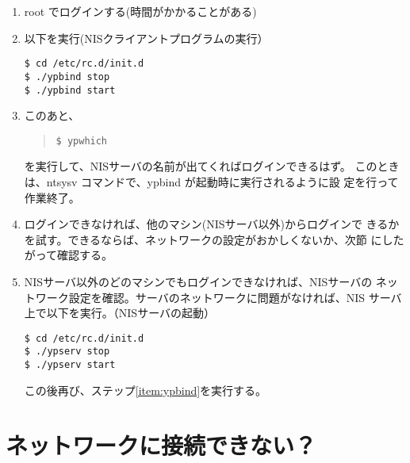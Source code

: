 \documentclass{jreport}
\begin{document}
\begin{enumerate}
\item root でログインする(時間がかかることがある)
\item \label{item:ypbind}以下を実行(NISクライアントプログラムの実行）
  \begin{screen}
\begin{verbatim}
$ cd /etc/rc.d/init.d
$ ./ypbind stop
$ ./ypbind start
\end{verbatim}
  \end{screen}
\item このあと、
  \begin{quote}
\begin{verbatim}
$ ypwhich
\end{verbatim}
  \end{quote}
    を実行して、NISサーバの名前が出てくればログインできるはず。
    このときは、ntsysv コマンドで、ypbind が起動時に実行されるように設
    定を行って作業終了。
  \item ログインできなければ、他のマシン(NISサーバ以外)からログインで
    きるかを試す。できるならば、ネットワークの設定がおかしくないか、次節
    にしたがって確認する。
  \item NISサーバ以外のどのマシンでもログインできなければ、NISサーバの
    ネットワーク設定を確認。サーバのネットワークに問題がなければ、NIS
    サーバ上で以下を実行。（NISサーバの起動）
  \begin{screen}
\begin{verbatim}
$ cd /etc/rc.d/init.d
$ ./ypserv stop
$ ./ypserv start
\end{verbatim}
  \end{screen}
  この後再び、ステップ\ref{item:ypbind}を実行する。

\end{enumerate}

\section{ネットワークに接続できない？}
\end{document}
